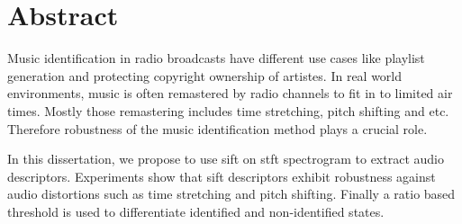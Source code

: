 \chapter*{Abstract}

Music identification in radio broadcasts have different use cases like playlist generation
and protecting copyright ownership of artistes. In real world environments, music is often
remastered by radio channels to fit in to limited air times. Mostly those remastering
includes time stretching, pitch shifting and etc. Therefore robustness of the music identification
method plays a crucial role. 
\vspace{12pt}

In this dissertation, we propose to use \ac{sift} on \ac{stft} spectrogram to extract audio
descriptors. Experiments show that \ac{sift} descriptors exhibit robustness against audio 
distortions such as time stretching and pitch shifting. Finally a ratio based threshold is
used to differentiate identified and non-identified states.  